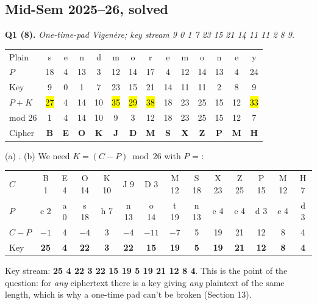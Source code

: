 \subsection{Mid-Sem 2025--26, solved}

\textbf{Q1 (8).} \emph{One-time-pad Vigen\`ere; key stream 9 0 1 7 23 15 21 14 11 11 2 8 9.}
\begin{center}\small\setlength{\tabcolsep}{4pt}
\begin{tabular}{@{}l*{13}{c}@{}}
\toprule
Plain & s&e&n&d&m&o&r&e&m&o&n&e&y\\
$P$ & 18&4&13&3&12&14&17&4&12&14&13&4&24\\
Key & 9&0&1&7&23&15&21&14&11&11&2&8&9\\
$P{+}K$ & \hl{27}&4&14&10&\hl{35}&\hl{29}&\hl{38}&18&23&25&15&12&\hl{33}\\
mod 26 & 1&4&14&10&9&3&12&18&23&25&15&12&7\\
Cipher & \textbf{B}&\textbf{E}&\textbf{O}&\textbf{K}&\textbf{J}&\textbf{D}&\textbf{M}&\textbf{S}&\textbf{X}&\textbf{Z}&\textbf{P}&\textbf{M}&\textbf{H}\\
\bottomrule
\end{tabular}
\end{center}
(a) \textbf{}.
(b) We need $K = (C - P) \bmod 26$ with $P$ = :
\begin{center}\small\setlength{\tabcolsep}{4pt}
\begin{tabular}{@{}l*{13}{c}@{}}
\toprule
$C$ & B 1&E 4&O 14&K 10&J 9&D 3&M 12&S 18&X 23&Z 25&P 15&M 12&H 7\\
$P$ & c 2&a 0&s 18&h 7&n 13&o 14&t 19&n 13&e 4&e 4&d 3&e 4&d 3\\
$C - P$ & $-1$&4&$-4$&3&$-4$&$-11$&$-7$&5&19&21&12&8&4\\
Key & \textbf{25}&\textbf{4}&\textbf{22}&\textbf{3}&\textbf{22}&\textbf{15}&\textbf{19}&\textbf{5}&\textbf{19}&\textbf{21}&\textbf{12}&\textbf{8}&\textbf{4}\\
\bottomrule
\end{tabular}
\end{center}
Key stream: \textbf{25 4 22 3 22 15 19 5 19 21 12 8 4}. This is the point of the question: for \emph{any} ciphertext there is a key giving \emph{any} plaintext of the same length, which is why a one-time pad can't be broken (Section 13).

